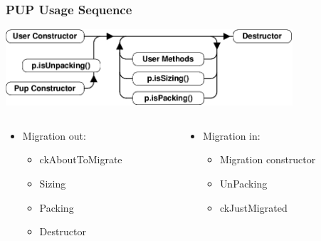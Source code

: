 \begin{frame}[fragile]
\frametitle{PUP Usage Sequence}
  \begin{center}
    \includegraphics[width=0.8\textwidth]{figures/PUPUsage.png}
  \end{center}
\begin{columns}
 \begin{column}{0.5\textwidth}
 \begin{itemize}
 \item Migration out:
 \begin{itemize}
 \item ckAboutToMigrate
 \item Sizing
 \item Packing
 \item Destructor
 \end{itemize}
 \end{itemize}
 \end{column}
 \begin{column}{0.5\textwidth}
 \begin{itemize}
 \item Migration in:
 \begin{itemize}
 \item Migration constructor
 \item UnPacking
 \item ckJustMigrated
 \end{itemize}
 \end{itemize}
\end{column}
\end{columns}
\end{frame}

